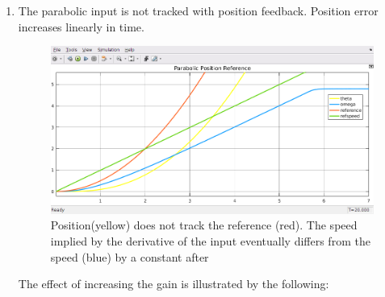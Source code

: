 \documentclass[11pt,a4paper]{article}
\begin{document}
\begin{enumerate}
\begin{figure}[h!]
\begin{subfigure}{.5\textwidth}
		\caption{Family of position errors for the same K values.}	
	\end{subfigure}
\end{figure}
	
	Increasing the feedback gain reduces the limiting value of the position error, but does not completely eliminate it.
	
	\item The parabolic input is not tracked with position feedback. Position error increases linearly in time.
	
	\begin{figure}[h!]
	\includegraphics[width=\textwidth]{imglab/lab4sol_parapostraj.png}
	\caption{Position(yellow) does not track the reference (red). The speed implied by the derivative of the input eventually differs from the speed (blue) by a constant after}
	\end{figure}	
	
	The effect of increasing the gain is illustrated by the following:
	

\end{enumerate}
\end{document}

